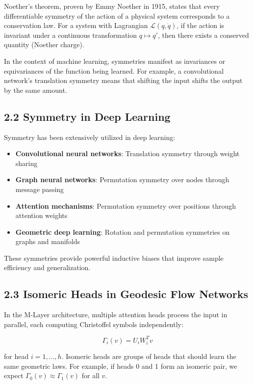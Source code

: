 \documentclass[12pt]{article}
\begin{document}
Noether's theorem, proven by Emmy Noether in 1915, states that every differentiable symmetry of the action of a physical system corresponds to a conservation law. For a system with Lagrangian $\mathcal{L}(q, \dot{q})$, if the action is invariant under a continuous transformation $q \mapsto q'$, then there exists a conserved quantity (Noether charge).

In the context of machine learning, symmetries manifest as invariances or equivariances of the function being learned. For example, a convolutional network's translation symmetry means that shifting the input shifts the output by the same amount.

\subsection{2.2 Symmetry in Deep Learning}

Symmetry has been extensively utilized in deep learning:

\begin{itemize}
\item \textbf{Convolutional neural networks}: Translation symmetry through weight sharing
\item \textbf{Graph neural networks}: Permutation symmetry over nodes through message passing
\item \textbf{Attention mechanisms}: Permutation symmetry over positions through attention weights
\item \textbf{Geometric deep learning}: Rotation and permutation symmetries on graphs and manifolds
\end{itemize}

These symmetries provide powerful inductive biases that improve sample efficiency and generalization.

\subsection{2.3 Isomeric Heads in Geodesic Flow Networks}

In the M-Layer architecture, multiple attention heads process the input in parallel, each computing Christoffel symbols independently:

\begin{equation}
\Gamma_i(v) = U_i W_i^T v
\end{equation}

for head $i = 1, ..., h$. Isomeric heads are groups of heads that should learn the same geometric laws. For example, if heads 0 and 1 form an isomeric pair, we expect $\Gamma_0(v) \approx \Gamma_1(v)$ for all $v$.
\end{document}

